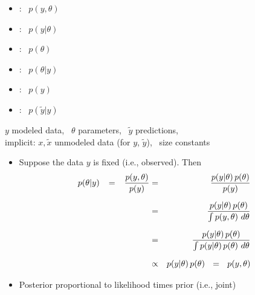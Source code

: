 \documentclass[10pt]{report}
\newcommand{\sld}[1]{\newpage{\noindent\LARGE \ \ \
    \textcolor{MidnightBlue}{\bfseries #1}}\vspace*{4pt}}
\newcommand{\spc}{\hspace*{0.25in}}
\newcommand{\myemph}[1]{{\color{MidnightBlue}{\bfseries #1}}}
\begin{document}
\sld{Distribution Naming Conventions}

\begin{itemize}
\item \myemph{Joint}: \ $p(y,\theta)$
\item \myemph{Sampling / Likelihood}: \ $p(y|\theta)$
\item \myemph{Prior}: \ $p(\theta)$
\item \myemph{Posterior}: \ $p(\theta|y)$
\item \myemph{Data Marginal}: \ $p(y)$
\item \myemph{Posterior Predictive}: \ $p(\tilde{y}|y)$
\end{itemize}

\noindent
\spc
{\footnotesize $y$ modeled data, \, $\theta$ parameters, \, $\tilde{y}$ predictions,}
\\[4pt]
\spc
{\footnotesize implicit: $x, \tilde{x}$ unmodeled data (for $y$, $\tilde{y}$), \ size constants}

\sld{Bayes's Rule for the Posterior}
% 
\begin{itemize}
\item Suppose the data $y$ is fixed (i.e., observed).  Then
  \vspace*{2pt}
  \begin{eqnarray*}
    p(\theta|y) 
    \hspace*{8pt} = \hspace*{8pt} \frac{p(y,\theta)}{p(y)}
    & = & \frac{p(y|\theta) \, p(\theta)}{p(y)}
    \\[6pt]
    & = & \frac{p(y|\theta) \, p(\theta)}{\int p(y,\theta) \ d\theta}
    \\[6pt]
    & = & \frac{p(y|\theta) \, p(\theta)}{\int p(y|\theta) \, p(\theta) \ d\theta}
    \\[6pt]
    & \propto & p(y|\theta) \, p(\theta) \ \ = \ \ p(y,\theta)
  \end{eqnarray*}
\item Posterior proportional to likelihood times prior (i.e., joint)
\end{itemize}
\end{document}
